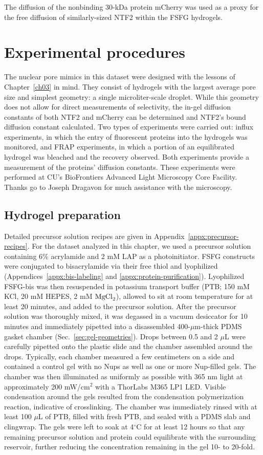 The diffusion of the nonbinding 30-kDa protein mCherry was used as a proxy for the free diffusion of similarly-sized NTF2 within the FSFG hydrogels.

\section{Experimental procedures}

The nuclear pore mimics in this dataset were designed with the lessons of Chapter~\ref{ch03} in mind.  They consist of hydrogels with the largest average pore size and simplest geometry: a single microliter-scale droplet.  While this geometry does not allow for direct measurements of selectivity, the in-gel diffusion constants of both NTF2 and mCherry can be determined and NTF2's bound diffusion constant calculated.  Two types of experiments were carried out: influx experiments, in which the entry of fluorescent proteins into the hydrogels was monitored, and FRAP experiments, in which a portion of an equilibrated hydrogel was bleached and the recovery observed.  Both experiments provide a measurement of the proteins' diffusion constants.  These experiments were performed at CU's BioFrontiers Advanced Light Microscopy Core Facility.  Thanks go to Joseph Dragavon for much assistance with the microscopy.

\subsection{Hydrogel preparation}

Detailed precursor solution recipes are given in Appendix~\ref{appx:precursor-recipes}.  For the dataset analyzed in this chapter, we used a precursor solution containing 6\% acrylamide and 2 mM LAP as a photoinitiator.  FSFG constructs were conjugated to bisacrylamide via their free thiol and lyophilized (Appendices~\ref{appx:bis-labeling} and \ref{appx:protein-purification}).   Lyophilized FSFG-bis was then resuspended in potassium transport buffer (PTB; 150 mM KCl, 20 mM HEPES, 2 mM $\mathrm{MgCl}_2$), allowed to sit at room temperature for at least 20 minutes, and added to the precursor solution.  After the precursor solution was thoroughly mixed, it was degassed in a vacuum desiccator for 10 minutes and immediately pipetted into a disassembled 400-$\mu$m-thick PDMS gasket chamber (Sec.~\ref{sec:gel-geometries}).  Drops between 0.5 and 2 $\mu$L were carefully pipetted onto the plastic slide and the chamber assembled around the drops.  Typically, each chamber measured a few centimeters on a side and contained a control gel with no Nups as well as one or more Nup-filled gels.  The chamber was then illuminated as uniformly as possible with 365 nm light at approximately 200 mW/cm$^2$ with a ThorLabs M365 LP1 LED.  Visible condensation around the gels resulted from the condensation polymerization reaction, indicative of crosslinking.  The chamber was immediately rinsed with at least 100 $\mu$L of PTB, filled with fresh PTB, and sealed with a PDMS slab and clingwrap.  The gels were left to soak at 4$^\circ$C for at least 12 hours so that any remaining precursor solution and protein could equilibrate with the surrounding reservoir, further reducing the concentration remaining in the gel 10- to 20-fold.

